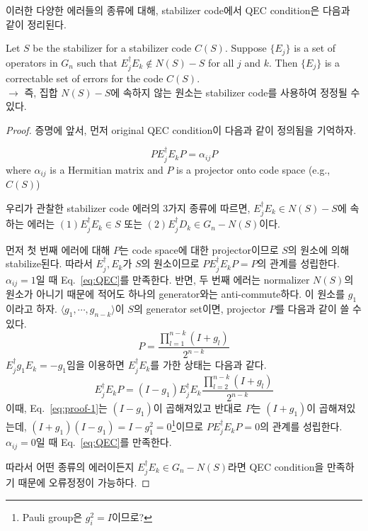 이러한 다양한 에러들의 종류에 대해, stabilizer code에서 QEC condition은 다음과 같이 정리된다.
\begin{theorem}
    Let $S$ be the stabilizer for a stabilizer code $C(S)$. Suppose $\{E_j\}$ is a set of operators in $G_n$ such that $E^\dagger_jE_k \not \in N(S) - S$ for all $j$ and $k$.
    Then $\{E_j\}$ is a correctable set of errors for the code $C(S)$. \\
    $\rightarrow$ 즉, 집합 $N(S) - S$에 속하지 않는 원소는 stabilizer code를 사용하여 정정될 수 있다.
\end{theorem}
\begin{proof}
    증명에 앞서, 먼저 original QEC condition이 다음과 같이 정의됨을 기억하자.
    \begin{remark}
        \begin{equation}
            PE_j^\dagger E_k P = \alpha_{ij} P \label{eq:QEC}
        \end{equation}
        where $\alpha_{ij}$ is a Hermitian matrix and $P$ is a projector onto code space (e.g., $C(S)$)
    \end{remark}
    우리가 관찰한 stabilizer code 에러의 3가지 종류에 따르면, $E_j^\dagger E_k \in N(S) - S$에 속하는 에러는 $(1) E_j^\dagger E_k \in S$ 또는 $(2) E_j^\dagger D_k \in G_n - N(S)$이다.
    \vspace{0.2cm}

    먼저 첫 번째 에러에 대해 $P$는 code space에 대한 projector이므로 $S$의 원소에 의해 stabilize된다. 따라서 $E_j^\dagger, E_k$가 $S$의 원소이므로 $PE_j^\dagger E_kP = P$의 관계를 성립한다. $\alpha_{ij} = 1$일 때 Eq.~\eqref{eq:QEC}를 만족한다. 
    반면, 두 번째 에러는 normalizer $N(S)$의 원소가 아니기 때문에 적어도 하나의 generator와는 anti-commute하다. 이 원소를 $g_1$이라고 하자. $\langle g_1, \cdots, g_{n-k}\rangle$이 $S$의 generator set이면, projector $P$를 다음과 같이 쓸 수 있다. 
    \begin{equation*}
        P=\frac{\prod_{l=1}^{n-k}\left(I+g_l\right)}{2^{n-k}}
    \end{equation*}
    $E^\dagger_j g_1 E_k = -g_1$임을 이용하면 $E^\dagger_j E_k$를 가한 상태는 다음과 같다. 
    \begin{equation}
        E_j^{\dagger} E_k P=\left(I-g_1\right) E_j^{\dagger} E_k \frac{\prod_{l=2}^{n-k}\left(I+g_l\right)}{2^{n-k}} \label{eq:proof-1}
    \end{equation}
    이때, Eq.~\eqref{eq:proof-1}는 $(I-g_1)$이 곱해져있고 반대로 $P$는 $(I+g_1)$이 곱해져있는데, $(I+g_1)(I-g_1) = I- g_1^2 = 0$\footnote{Pauli group은 $g_i^2 = I$이므로?}이므로 $PE_j^\dagger E_kP = 0$의 관계를 성립한다. $\alpha_{ij} = 0$일 때 Eq.~\eqref{eq:QEC}를 만족한다.
    \vspace{0.2cm}

    따라서 어떤 종류의 에러이든지 $E_j^\dagger E_k \in G_n - N(S)$라면 QEC condition을 만족하기 때문에 오류정정이 가능하다.
\end{proof}

